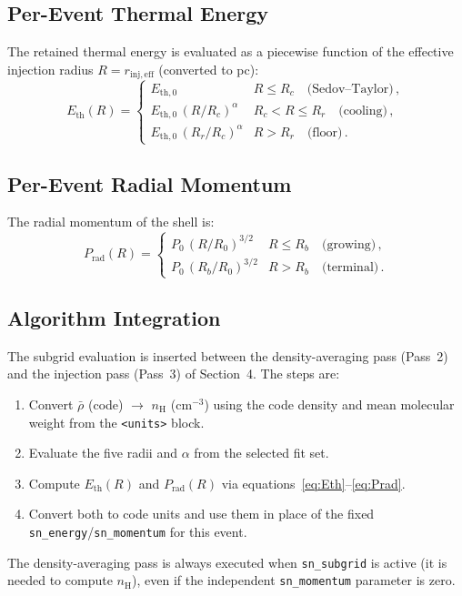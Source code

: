 \documentclass[11pt]{article}
\begin{document}
\subsection{Per-Event Thermal Energy}

The retained thermal energy is evaluated as a piecewise function of the
effective injection radius $R = r_\mathrm{inj,eff}$ (converted to pc):
\begin{equation}\label{eq:Eth}
  E_\mathrm{th}(R) =
  \begin{cases}
    E_\mathrm{th,0}                                         & R \leq R_c
      \quad\text{(Sedov--Taylor)}\,, \\[4pt]
    E_\mathrm{th,0}\,(R / R_c)^{\alpha}                     & R_c < R \leq R_r
      \quad\text{(cooling)}\,, \\[4pt]
    E_\mathrm{th,0}\,(R_r / R_c)^{\alpha}                   & R > R_r
      \quad\text{(floor)}\,.
  \end{cases}
\end{equation}

\subsection{Per-Event Radial Momentum}

The radial momentum of the shell is:
\begin{equation}\label{eq:Prad}
  P_\mathrm{rad}(R) =
  \begin{cases}
    P_0\,(R / R_0)^{3/2}       & R \leq R_b
      \quad\text{(growing)}\,, \\[4pt]
    P_0\,(R_b / R_0)^{3/2}     & R > R_b
      \quad\text{(terminal)}\,.
  \end{cases}
\end{equation}

\subsection{Algorithm Integration}

The subgrid evaluation is inserted between the density-averaging pass
(Pass~2) and the injection pass (Pass~3) of Section~4.  The steps are:
\begin{enumerate}
  \item Convert $\bar{\rho}$ (code) $\to$ $n_\mathrm{H}$ (cm$^{-3}$) using
    the code density and mean molecular weight from the \texttt{<units>} block.
  \item Evaluate the five radii and $\alpha$ from the selected fit set.
  \item Compute $E_\mathrm{th}(R)$ and $P_\mathrm{rad}(R)$ via
    equations~\eqref{eq:Eth}--\eqref{eq:Prad}.
  \item Convert both to code units and use them in place of the fixed
    \texttt{sn\_energy}/\texttt{sn\_momentum} for this event.
\end{enumerate}
The density-averaging pass is always executed when \texttt{sn\_subgrid} is
active (it is needed to compute $n_\mathrm{H}$), even if the independent
\texttt{sn\_momentum} parameter is zero.
\end{document}
